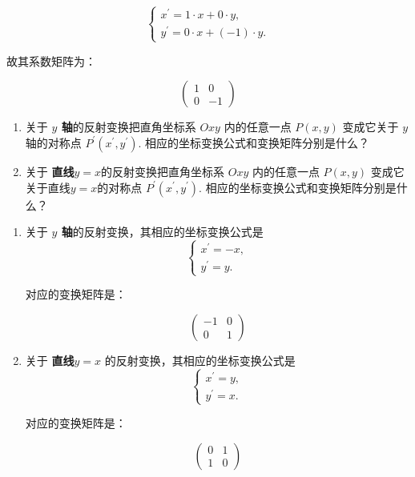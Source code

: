 \documentclass[lang=cn,newtx,10pt,scheme=chinese]{elegantbook}
\begin{document}
\begin{equation}
\left\{\begin{array}{l}
x^{\prime}=1 \cdot x + 0\cdot y, \\
y^{\prime}= 0\cdot x + (-1) \cdot y .
\end{array}\right.
\label{eq:反射变换的方程}
\end{equation}

故其系数矩阵为：

\begin{equation}
\left(\begin{array}{rr}
1  & 0 \\
0  & -1
\end{array}\right)
\label{eq:反射变换示例矩阵}
\end{equation}


\vspace{0.5cm}

\begin{exercise}
\begin{enumerate}
    \item 关于 \textbf{$y$ 轴}的反射变换把直角坐标系 $O x y$ 内的任意一点 $P(x, y)$ 变成它关于 $y$ 轴的对称点 $P^{\prime}\left(x^{\prime}, y^{\prime}\right)$. 相应的坐标变换公式和变换矩阵分别是什么？
    \item 关于 \textbf{直线$y=x$}的反射变换把直角坐标系 $O x y$ 内的任意一点 $P(x, y)$ 变成它关于直线$y=x$的对称点 $P^{\prime}\left(x^{\prime}, y^{\prime}\right)$. 相应的坐标变换公式和变换矩阵分别是什么？
\end{enumerate}
\end{exercise}

\begin{solution}

\begin{enumerate}
    \item 关于 \textbf{$y$ 轴}的反射变换，其相应的坐标变换公式是
$$
\left\{\begin{array}{c}
x^{\prime}=-x, \\
y^{\prime}=y .
\end{array}\right.
$$

对应的变换矩阵是：

$$
 \left(\begin{array}{cc}-1 & 0 \\ 0 & 1\end{array}\right)
$$
\item 关于 \textbf{直线$y=x$} 的反射变换，其相应的坐标变换公式是
$$
\left\{\begin{array}{c}
x^{\prime}=y, \\
y^{\prime}=x .
\end{array}\right.
$$

对应的变换矩阵是：

$$
 \left(\begin{array}{cc}0 & 1 \\ 1 & 0\end{array}\right)
$$
\end{enumerate}
\end{solution}
\end{document}
